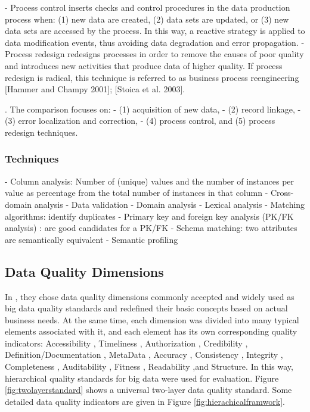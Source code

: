 \documentclass[pdftex,english,oribibl]{llncs}
\begin{document}
- Process control inserts checks and control procedures in the data production process when: (1) new data are created, (2) data sets are updated, or (3) new data sets are accessed by the process. In this way, a reactive strategy is applied to data modification events, thus avoiding data degradation and error propagation.
- Process redesign redesigns processes in order to remove the causes of poor quality and introduces new activities that produce data of higher quality. If process redesign is radical, this technique is referred to as business process reengineering [Hammer and Champy 2001]; [Stoica et al. 2003].

. The comparison focuses on:
- (1) acquisition of new data,
- (2) record linkage,
- (3) error localization and correction,
- (4) process control, and (5) process redesign techniques.

\subsubsection{Techniques}
 - Column analysis: Number of (unique) values and the number of instances per value as percentage from the total number of instances in that column
 - Cross-domain analysis
 - Data validation
 - Domain analysis
 - Lexical analysis
 - Matching algorithms: identify duplicates
 - Primary key and foreign key analysis (PK/FK analysis) : are good candidates for a PK/FK
 - Schema matching: two attributes are semantically equivalent
 - Semantic profiling

\subsection{Data Quality Dimensions}

In \citet{Cai2005ChallnegesOfDataQuality}, they chose data quality dimensions commonly accepted and widely used as big data quality standards and redefined their basic concepts based on actual business needs.
At the same time, each dimension was divided into many typical elements associated with it, and each element has its own corresponding quality indicators: Accessibility
, Timeliness
, Authorization
, Credibility
, Definition/Documentation
, MetaData
, Accuracy
, Consistency
, Integrity
, Completeness
, Auditability
, Fitness
, Readability
,and Structure.
In this way, hierarchical quality standards for big data were used for evaluation.
Figure \ref{fig:twolayerstandard} shows a universal two-layer data quality standard. Some detailed data quality indicators are given in Figure \ref{fig:hierachicalframwork}.
\end{document}
